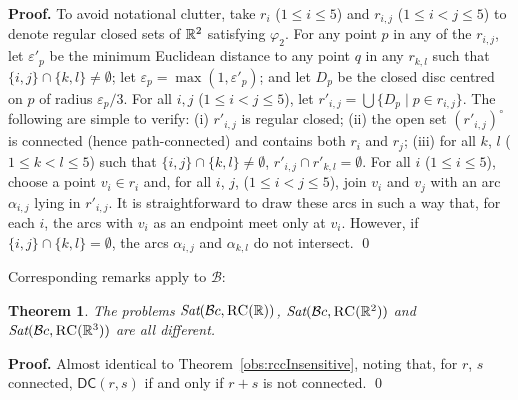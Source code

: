 \documentclass{LMCS}
\renewenvironment{proof}{\par\noindent\textbf{Proof.}}{\mbox{}\qed\par\medskip}
\theoremstyle{plain}
\newtheorem{theorem}[thm]{Theorem}
\newcommand{\cB}{\ensuremath{\mathcal{B}}}\newcommand{\cBc}{\ensuremath{\mathcal{B}c}}\newcommand{\cBcc}{\ensuremath{\mathcal{B}cc}}
\newcommand{\ti}[2][]{#2^{\circ_{#1}}}
\newcommand{\Sat}{\textit{Sat}}
\begin{document}
\begin{proof}
To avoid notational clutter, take $r_{i}$ ($1 \leq i \leq 5$) and
$r_{i,j}$ ($1 \leq i < j \leq 5$) to denote regular closed sets of
$\mathbb{R}^2$ satisfying $\varphi_2$. For any point $p$ in any of the
$r_{i,j}$, let $\varepsilon'_p$ be the minimum Euclidean distance to
any point $q$ in any $r_{k,l}$ such that $\{i,j\} \cap \{k,l\} \neq
\emptyset$; let $\varepsilon_p = \max(1, \varepsilon'_p)$;
and let $D_p$ be the closed disc centred on $p$ of radius
$\varepsilon_p/3$. For all $i, j$ ($1 \leq i < j \leq 5$), let
$r'_{i,j} = \bigcup \{ D_p \mid p \in r_{i,j} \}$. The following are
simple to verify: (i) $r'_{i,j}$ is regular closed; (ii) the open set
$\ti{(r'_{i,j})}$ is connected (hence path-connected) and contains
both $r_i$ and $r_j$; (iii) for all $k$, $l$ ($1 \leq k < l \leq 5$)
such that $\{i,j\} \cap \{k,l\} \neq \emptyset$, $r'_{i,j} \cap
r'_{k,l} = \emptyset$. For all $i$ ($1 \leq i \leq 5$), choose a point
$v_i \in r_i$ and, for all $i$, $j$, ($1 \leq i < j \leq 5$), join
$v_i$ and $v_j$ with an arc $\alpha_{i,j}$ lying in $r'_{i,j}$. It is
straightforward to draw these arcs in such a way that, for each $i$,
the arcs with $v_i$ as an endpoint meet only at $v_i$. However, if
$\{i,j\} \cap \{k,l\} = \emptyset$, the arcs $\alpha_{i,j}$ and
$\alpha_{k,l}$ do not intersect.
\end{proof}
Corresponding remarks apply to $\cB$:
\begin{theorem}
The problems $\Sat(\cBc, \RegC(\R))$, $\Sat(\cBc, \RegC(\R^2))$
and $\Sat(\cBc, \RegC(\R^3))$ are all different.
\label{obs:Binsensitive}
\end{theorem}
\begin{proof}
Almost identical to Theorem~\ref{obs:rccInsensitive}, noting that, for
$r$, $s$ connected, $\mathsf{DC}(r, s)$ if and only if $r+s$ is not
connected.
\end{proof}
\end{document}
